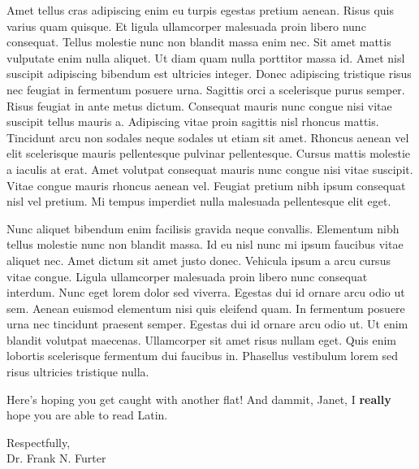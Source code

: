 Amet tellus cras adipiscing enim eu turpis egestas pretium aenean. Risus quis varius quam quisque. Et ligula ullamcorper malesuada proin libero nunc consequat. Tellus molestie nunc non blandit massa enim nec. Sit amet mattis vulputate enim nulla aliquet. Ut diam quam nulla porttitor massa id. Amet nisl suscipit adipiscing bibendum est ultricies integer. Donec adipiscing tristique risus nec feugiat in fermentum posuere urna. Sagittis orci a scelerisque purus semper. Risus feugiat in ante metus dictum. Consequat mauris nunc congue nisi vitae suscipit tellus mauris a. Adipiscing vitae proin sagittis nisl rhoncus mattis. Tincidunt arcu non sodales neque sodales ut etiam sit amet. Rhoncus aenean vel elit scelerisque mauris pellentesque pulvinar pellentesque. Cursus mattis molestie a iaculis at erat. Amet volutpat consequat mauris nunc congue nisi vitae suscipit. Vitae congue mauris rhoncus aenean vel. Feugiat pretium nibh ipsum consequat nisl vel pretium. Mi tempus imperdiet nulla malesuada pellentesque elit eget.

Nunc aliquet bibendum enim facilisis gravida neque convallis. Elementum nibh tellus molestie nunc non blandit massa. Id eu nisl nunc mi ipsum faucibus vitae aliquet nec. Amet dictum sit amet justo donec. Vehicula ipsum a arcu cursus vitae congue. Ligula ullamcorper malesuada proin libero nunc consequat interdum. Nunc eget lorem dolor sed viverra. Egestas dui id ornare arcu odio ut sem. Aenean euismod elementum nisi quis eleifend quam. In fermentum posuere urna nec tincidunt praesent semper. Egestas dui id ornare arcu odio ut. Ut enim blandit volutpat maecenas. Ullamcorper sit amet risus nullam eget. Quis enim lobortis scelerisque fermentum dui faucibus in. Phasellus vestibulum lorem sed risus ultricies tristique nulla.

Here's hoping you get caught with another flat! And dammit, Janet, I \textbf{really} hope you are able to read Latin.

\vspace{0.5cm}

\noindent Respectfully,	\\
Dr. Frank N. Furter




